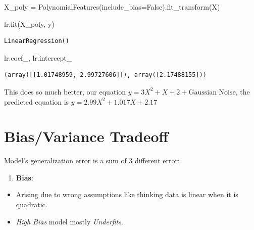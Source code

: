 \documentclass[
]{report}
\newenvironment{Shaded}{\begin{snugshade}}{\end{snugshade}}
\newcommand{\NormalTok}[1]{\textcolor[rgb]{0.00,0.23,0.31}{#1}}
\newcommand{\OperatorTok}[1]{\textcolor[rgb]{0.37,0.37,0.37}{#1}}
\newcommand{\VariableTok}[1]{\textcolor[rgb]{0.07,0.07,0.07}{#1}}
\providecommand{\tightlist}{%
  \setlength{\itemsep}{0pt}\setlength{\parskip}{0pt}}\usepackage{longtable,booktabs,array}
\begin{document}
\begin{Shaded}
\begin{Highlighting}[]
\NormalTok{X\_poly }\OperatorTok{=}\NormalTok{ PolynomialFeatures(include\_bias}\OperatorTok{=}\VariableTok{False}\NormalTok{).fit\_transform(X)}
\end{Highlighting}
\end{Shaded}

\begin{Shaded}
\begin{Highlighting}[]
\NormalTok{lr.fit(X\_poly, y)}
\end{Highlighting}
\end{Shaded}

\begin{verbatim}
LinearRegression()
\end{verbatim}

\begin{Shaded}
\begin{Highlighting}[]
\NormalTok{lr.coef\_, lr.intercept\_}
\end{Highlighting}
\end{Shaded}

\begin{verbatim}
(array([[1.01748959, 2.99727606]]), array([2.17488155]))
\end{verbatim}

This does so much better, our equation
\(y = 3X^{2} + X + 2 + \text{Gaussian Noise}\), the predicted equation
is \(y = 2.99X^{2} + 1.017 X + 2.17\)

\hypertarget{biasvariance-tradeoff}{%
\chapter{Bias/Variance Tradeoff}\label{biasvariance-tradeoff}}

Model's generalization error is a sum of 3 different error:

\begin{enumerate}
\def\labelenumi{\arabic{enumi}.}
\tightlist
\item
  \textbf{Bias}:
\end{enumerate}

\begin{itemize}
\tightlist
\item
  Arising due to wrong assumptions like thinking data is linear when it
  is quadratic.
\item
  \emph{High Bias} model mostly \emph{Underfits}.
\end{itemize}
\end{document}

